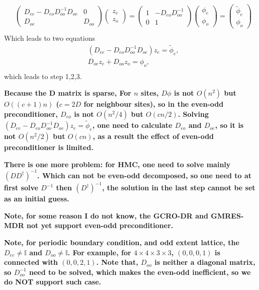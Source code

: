 \begin{equation}
\begin{split}
&\left(\begin{array}{cc}D_{ee}-D_{eo}D_{oo}^{-1}D_{oe} & 0 \\ D_{oe} & D_{oo}\end{array}\right) \left(\begin{array}{c}z_e \\ z_o \end{array}\right)=\left(\begin{array}{cc}1 & -D_{eo}D_{oo}^{-1} \\ 0 & 1\end{array}\right)\left(\begin{array}{c}\phi _e \\ \phi_o \end{array}\right)=\left(\begin{array}{c}\tilde{\phi} _e \\ \phi_o \end{array}\right)\\
\end{split}
\end{equation}
Which leads to two equations
\begin{equation}
\begin{split}
&(D_{ee}-D_{eo}D_{oo}^{-1}D_{oe})z_e = \tilde{\phi}_e,\\
&D_{oe} z_e + D_{oo} z_o = \phi _o, \\
\end{split}
\end{equation}
which leads to step 1,2,3.

\textbf{Because the D matrix is sparse, For $n$ sites, $D\phi$ is not $O(n^2)$ but $O((c+1)n)$ ($c=2D$ for neighbour sites), so in the even-odd preconditioner, $D_{eo}$ is not $O(n^2/4)$ but $O(cn/2)$. Solving $\left(D_{ee}- D_{eo}D_{oo}^{-1}D_{oe} \right) z_e = \tilde{\phi}_e$, one need to calculate $D_{eo}$ and $D_{oe}$, so it is not $O(n^2/2)$ but $O(cn)$, as a result the effect of even-odd preconditioner is limited.}

\textbf{There is one more problem: for HMC, one need to solve mainly $(DD^{\dagger})^{-1}$. Which can not be even-odd decomposed, so one need to at first solve $D^{-1}$ then $(D^{\dagger})^{-1}$, the solution in the last step cannot be set as an initial guess.}

\textcolor[rgb]{1,0,0}{\textbf{Note, for some reason I do not know, the GCRO-DR and GMRES-MDR not yet support even-odd preconditioner.}}

\textcolor[rgb]{1,0,0}{\textbf{Note, for periodic boundary condition, and odd extent lattice, the $D_{ee}\neq \mathbb{I}$ and $D_{oo}\neq \mathbb{I}$. For example, for $4\times 4\times 3\times 3$, $(0,0,0,1)$ is connected with $(0,0,2,1)$. Note that, $D_{oo}$ is neither a diagonal matrix, so $D_{oo}^{-1}$ need to be solved, which makes the even-odd inefficient, so we do NOT support such case.}}

